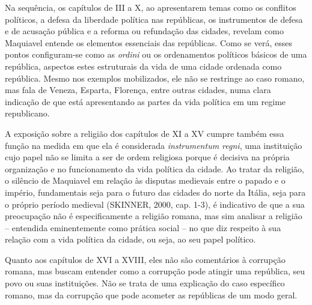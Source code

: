 Na sequência, os capítulos de III a X, ao apresentarem temas como os
conflitos políticos, a defesa da liberdade política nas repúblicas, os
instrumentos de defesa e de acusação pública e a reforma ou refundação
das cidades, revelam como Maquiavel entende os elementos essenciais das
repúblicas. Como se verá, esses pontos configuram-se como as
\emph{ordini} ou os ordenamentos políticos básicos de uma república,
aspectos estes estruturais da vida de uma cidade ordenada como
república. Mesmo nos exemplos mobilizados, ele não se restringe ao caso
romano, mas fala de Veneza, Esparta, Florença, entre outras cidades,
numa clara indicação de que está apresentando as partes da vida política
em um regime republicano.

A exposição sobre a religião dos capítulos de XI a XV cumpre também essa
função na medida em que ela é considerada \emph{instrumentum regni}, uma
instituição cujo papel não se limita a ser de ordem religiosa porque é
decisiva na própria organização e no funcionamento da vida política da
cidade. Ao tratar da religião, o silêncio de Maquiavel em relação às
disputas medievais entre o papado e o império, fundamentais seja para o
futuro das cidades do norte da Itália, seja para o próprio período
medieval (SKINNER, 2000, cap. 1-3), é indicativo de que a sua
preocupação não é especificamente a religião romana, mas sim analisar a
religião -- entendida eminentemente como prática social -- no que diz
respeito à sua relação com a vida política da cidade, ou seja, ao seu
papel político.

Quanto aos capítulos de XVI a XVIII, eles não são comentários à
corrupção romana, mas buscam entender como a corrupção pode atingir uma
república, seu povo ou suas instituições. Não se trata de uma explicação
do caso específico romano, mas da corrupção que pode acometer as
repúblicas de um modo geral.

